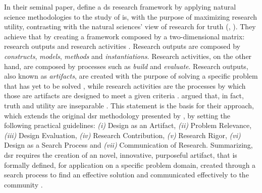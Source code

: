 In their seminal paper, \citeauthor{march_design_1995} define a \gls{ds} research framework by applying natural science methodologies to the study of \gls{is}, with the purpose of maximizing research utility, contrasting with the natural sciences' view of research for truth (\cite[80]{hevner_design_2004}, \cite[253]{march_design_1995}). They achieve that by creating a framework composed by a two-dimensional matrix: research outputs and research activities \cite[255]{march_design_1995}. Research outputs are composed by \textit{constructs}, \textit{models}, \textit{methods} and \textit{instantiations}. Research activities, on the other hand, are composed by processes such as \textit{build} and \textit{evaluate}. Research outputs, also known as \textit{artifacts}, are created with the purpose of solving a specific problem that has yet to be solved \cite[78]{hevner_design_2004}, while research activities are the processes by which those are artifacts are designed to meet a given criteria \cite[79--80]{hevner_design_2004}. \citeauthor{hevner_design_2004} argued that, in fact, truth and utility are inseparable \cite[80]{hevner_design_2004}. This statement is the basis for their approach, which extends the original \gls{dsr} methodology presented by \citeauthor{march_design_1995}, by setting the following practical guidelines: \emph{(i)} Design as an Artifact, \emph{(ii)} Problem Relevance, \emph{(iii)} Design Evaluation, \emph{(iv)} Research Contribution, \emph{(v)} Research Rigor, \emph{(vi)} Design as a Search Process and \emph{(vii)} Communication of Research. Summarizing, \gls{dsr} requires the creation of an novel, innovative, purposeful artifact, that is formally defined, for application on a specific problem domain, created through a search process to find an effective solution and communicated effectively to the community \cite[82]{hevner_design_2004}.

